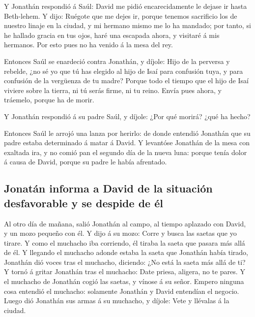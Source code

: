  Y Jonathán respondió á Saúl: David me pidió
encarecidamente le dejase ir hasta Beth-lehem.  Y dijo:
Ruégote que me dejes ir, porque tenemos sacrificio los de nuestro linaje
en la ciudad, y mi hermano mismo me lo ha mandado; por tanto, si he
hallado gracia en tus ojos, haré una escapada ahora, y visitaré á mis
hermanos. Por esto pues no ha venido á la mesa del rey.

 Entonces Saúl se enardeció contra Jonathán, y díjole: Hijo
de la perversa y rebelde, ¿no sé yo que tú has elegido al hijo de Isaí
para confusión tuya, y para confusión de la vergüenza de tu madre?
 Porque todo el tiempo que el hijo de Isaí viviere sobre la
tierra, ni tú serás firme, ni tu reino. Envía pues ahora, y tráemelo,
porque ha de morir.

 Y Jonathán respondió á su padre Saúl, y díjole: ¿Por qué
morirá? ¿qué ha hecho?

 Entonces Saúl le arrojó una lanza por herirlo: de donde
entendió Jonathán que su padre estaba determinado á matar á David.
 Y levantóse Jonathán de la mesa con exaltada ira, y no
comió pan el segundo día de la nueva luna: porque tenía dolor á causa de
David, porque su padre le había afrentado.

\hypertarget{jonatuxe1n-informa-a-david-de-la-situaciuxf3n-desfavorable-y-se-despide-de-uxe9l}{%
\subsection{Jonatán informa a David de la situación desfavorable y se
despide de
él}\label{jonatuxe1n-informa-a-david-de-la-situaciuxf3n-desfavorable-y-se-despide-de-uxe9l}}

 Al otro día de mañana, salió Jonathán al campo, al tiempo
aplazado con David, y un mozo pequeño con él.  Y dijo á su
mozo: Corre y busca las saetas que yo tirare. Y como el muchacho iba
corriendo, él tiraba la saeta que pasara más allá de él.  Y
llegando el muchacho adonde estaba la saeta que Jonathán había tirado,
Jonathán dió voces tras el muchacho, diciendo: ¿No está la saeta más
allá de ti?  Y tornó á gritar Jonathán tras el muchacho:
Date priesa, aligera, no te pares. Y el muchacho de Jonathán cogió las
saetas, y vínose á su señor.  Empero ninguna cosa entendió
el muchacho: solamente Jonathán y David entendían el negocio.
 Luego dió Jonathán sus armas á su muchacho, y díjole: Vete
y llévalas á la ciudad.

